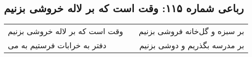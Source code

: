 \begin{center}
\section*{رباعی شماره ۱۱۵: وقت است که بر لاله خروشی بزنیم}
\label{sec:115}
\begin{longtable}{l p{0.5cm} r}
وقت است که بر لاله خروشی بزنیم
&&
بر سبزه و گل‌خانه فروشی بزنیم
\\
دفتر به خرابات فرستیم به می
&&
بر مدرسه بگذریم و دوشی بزنیم
\\
\end{longtable}
\end{center}
